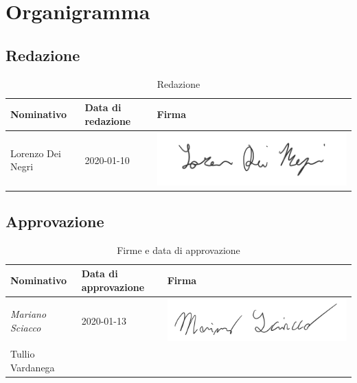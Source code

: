 	\section{Organigramma}
		
		\subsection{Redazione}
			
			\begin{table}[!h]
				\centering
					\begin{tabular}{|l|l|l|}
						\hline
						\textbf{Nominativo} & \textbf{Data di redazione} & \textbf{Firma} \\ \hline
						Lorenzo Dei Negri & 2020-01-10 &  \includegraphics[scale=0.6]{images/firme/lorenzo} \\ \hline
					\end{tabular}
				\caption{Redazione}
			\end{table}
		
		\subsection{Approvazione}
			
			\begin{table}[!h]
				\centering
				\begin{tabular}{|l|l|l|}
					\hline
					\textbf{Nominativo} & \textbf{Data di approvazione} & \textbf{Firma} \\ \hline
					\textit{Mariano Sciacco} & 2020-01-13 &  \includegraphics[scale=0.6]{images/firme/mariano}  \\ \hline
					Tullio Vardanega &  & \\ \hline
				\end{tabular}
				\caption{Firme e data di approvazione}
			\end{table}
			
